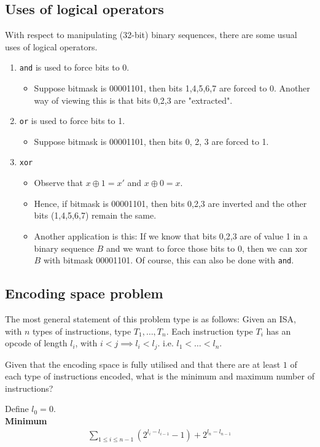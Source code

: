 \documentclass{article}
\begin{document}
\subsection{Uses of logical operators}
With respect to manipulating (32-bit) binary sequences, there are some usual uses of logical operators.
\begin{enumerate}
	\item \texttt{and} is used to force bits to 0. 
	\begin{itemize}
		\item Suppose bitmask is 00001101, then bits 1,4,5,6,7 are forced to 0. Another way of viewing this is that bits 0,2,3 are "extracted".
	\end{itemize} 
	\item \texttt{or} is used to force bits to 1. 
	\begin{itemize}
		\item Suppose bitmask is 00001101, then bits 0, 2, 3 are forced to 1.
	\end{itemize}
	\item \texttt{xor}
	\begin{itemize}
		\item Observe that $x\oplus 1=x'$ and $x\oplus 0=x$.
		\item Hence, if bitmask is 00001101, then bits 0,2,3 are inverted and the other bits (1,4,5,6,7) remain the same.
		\item Another application is this: If we know that bits 0,2,3 are of value 1 in a binary sequence $B$ and we want to force those bits to 0, then we can xor $B$ with bitmask 00001101. Of course, this can also be done with \texttt{and}.
	\end{itemize}
\end{enumerate}



\subsection{Encoding space problem}
The most general statement of this problem type is as follows: Given an ISA, with $n$ types of instructions, type $T_1, \dots, T_n$. Each instruction type $T_i$ has an opcode of length $l_i$, with $i < j\implies l_i < l_j$. i.e. $l_1 < \dots < l_n$.

Given that the encoding space is fully utilised and that there are at least $1$ of each type of instructions encoded, what is the minimum and maximum number of instructions?

Define $l_0=0$.\\
\textbf{Minimum} 
\begin{align*}
	\sum_{1\leq i\leq n-1}(2^{l_i-l_{i-1}}-1) + 2^{l_n-l_{n-1}}
\end{align*}
\end{document}
